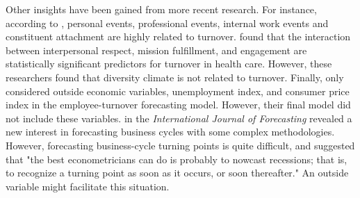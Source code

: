 Other insights have been gained from more recent research. For instance, according to \citet{tews2014}, personal events, professional events, internal work events and constituent attachment are highly related to turnover. \citet{collini2015} found that the interaction between interpersonal respect, mission fulfillment, and engagement are statistically significant predictors for turnover in health care. However, these researchers found that diversity climate is not related to turnover. Finally, only \citet{sexton2005} considered outside economic variables, unemployment index, and consumer price index in the employee-turnover forecasting model. However, their final model did not include these variables.  
\citet{ferrara2014} in the {\it International Journal of Forecasting} revealed a new interest in forecasting business cycles with some complex methodologies. However, forecasting business-cycle turning points is quite difficult, and \citet{hamilton2011} suggested that "the best econometricians can do is probably to nowcast recessions; that is, to recognize a turning point as soon as it occurs, or soon thereafter." An outside variable might facilitate this situation.  
